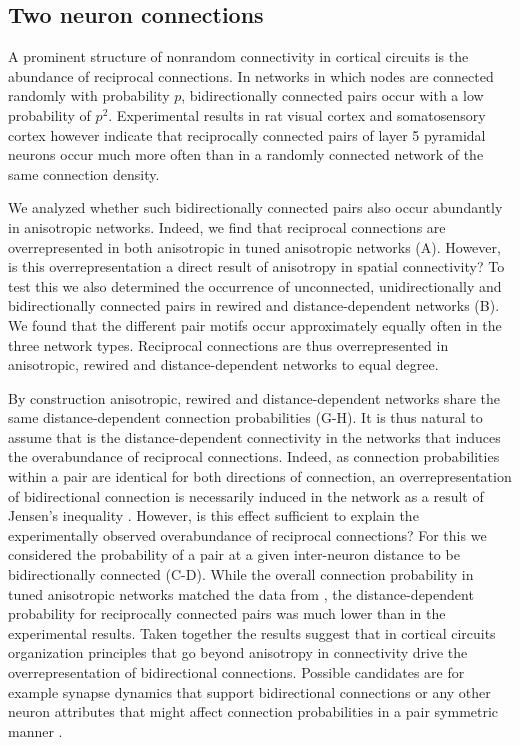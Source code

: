 \subsection*{Two neuron connections}

A prominent structure of nonrandom connectivity in cortical circuits
is the abundance of reciprocal connections. In networks in which nodes
are connected randomly with probability $p$, bidirectionally connected
pairs occur with a low probability of $p^2$. Experimental results in
 rat visual cortex \cite{Song2005} and somatosensory cortex
\cite{Markram1997, Perin2011} however indicate that reciprocally
connected pairs of layer 5 pyramidal neurons occur much more often
than in a randomly connected network of the same connection density.

We analyzed whether such bidirectionally connected pairs also occur
abundantly in anisotropic networks. Indeed, we find that reciprocal
connections are overrepresented in both anisotropic in tuned
anisotropic networks (A). However, is this
overrepresentation a direct result of anisotropy in spatial
connectivity? To test this we also determined the occurrence of
unconnected, unidirectionally and bidirectionally connected pairs in
rewired and distance-dependent networks (B). We
found that the different pair motifs occur approximately equally often
in the three network types. Reciprocal connections are thus
overrepresented in anisotropic, rewired and distance-dependent
networks to equal degree.



By construction anisotropic, rewired and distance-dependent networks
share the same distance-dependent connection probabilities
(G-H). It is thus natural to assume that is
the distance-dependent connectivity in the networks that induces the
overabundance of reciprocal connections. Indeed, as connection
probabilities within a pair are identical for both directions of
connection, an overrepresentation of bidirectional connection is
necessarily induced in the network as a result of Jensen's inequality
\cite{Hoffmann2017}. However, is this effect sufficient to explain the
experimentally observed overabundance of reciprocal connections? For
this we considered the probability of a pair at a given inter-neuron
distance to be bidirectionally connected
(C-D). While the overall connection probability
in tuned anisotropic networks matched the data from
\textcite{Perin2011}, the distance-dependent probability for
reciprocally connected pairs was much lower than in the experimental
results. Taken together the results suggest that in cortical circuits
organization principles that go beyond anisotropy in connectivity
drive the overrepresentation of bidirectional connections. Possible
candidates are for example synapse dynamics that support bidirectional
connections \cite{Clopath2010} or any other neuron attributes that might
affect connection probabilities in a pair symmetric manner
\cite{Hoffmann2017, Lee2016a}.

